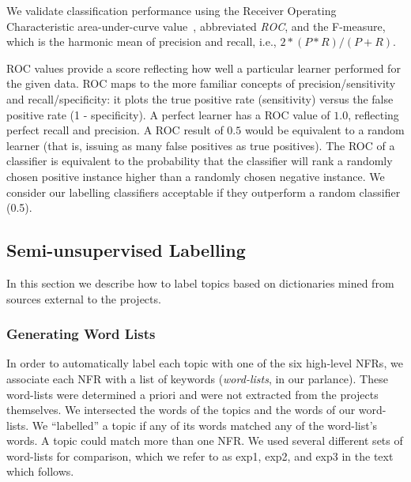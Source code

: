 \documentclass[smallextended]{svjour3}       %
\begin{document}
We validate classification performance using the Receiver Operating
Characteristic area-under-curve value~\cite{Fawcett2006861},
abbreviated \emph{ROC}, and the F-measure, which is the harmonic mean of precision and recall, i.e., $2 * (P * R) / (P + R)$. 

ROC values provide a score %
 reflecting how well a particular learner performed for the given data. 
ROC maps to the more familiar concepts of precision/sensitivity and recall/specificity: it plots the true positive rate (sensitivity) versus the false
positive rate (1 - specificity). 
A perfect learner has a ROC value of $1.0$, reflecting perfect recall and precision. 
A ROC result of $0.5$ would be equivalent to a random learner (that is, issuing as many false positives as true positives). 
The %
ROC of a classifier is equivalent to the probability that the classifier will rank a randomly chosen positive instance higher than a randomly chosen
negative instance.
We consider our labelling classifiers acceptable if they outperform a random classifier (0.5). 

\subsection{Semi-unsupervised Labelling}
\label{sec:unsuplabelling}

In this section we describe how to label topics based on dictionaries
mined from sources external to the projects.


\subsubsection{Generating Word Lists}


In order to automatically label each topic with 
one of the six high-level NFRs,
we associate each NFR with a list
of keywords (\emph{word-lists}, in our parlance). These word-lists were determined a priori and were not extracted from the projects themselves.
We intersected the words of the topics and the words of our word-lists.
We ``labelled'' a topic if any of its words matched any of the word-list's words.
A topic could match more than one NFR.
We used several different sets of word-lists for comparison, which we
refer to as \textsf{exp1}, \textsf{exp2}, and \textsf{exp3} in the text which follows. 
\end{document}
